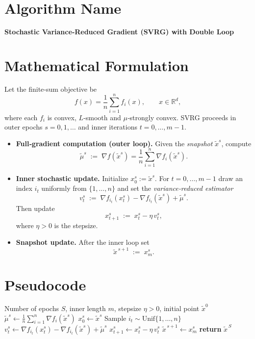 \documentclass{article}
\newcommand{\R}{\mathbb{R}}
\begin{document}
\section*{Algorithm Name}
\textbf{Stochastic Variance‑Reduced Gradient (SVRG) with Double Loop}

\section*{Mathematical Formulation}
Let the finite‑sum objective be 
\[
f(x)=\frac{1}{n}\sum_{i=1}^{n}f_i(x),\qquad x\in\R^{d},
\]
where each $f_i$ is convex, $L$‑smooth and $\mu$‑strongly convex.  
SVRG proceeds in outer epochs $s=0,1,\dots$ and inner iterations $t=0,\dots,m-1$.

\begin{itemize}
\item \textbf{Full‑gradient computation (outer loop).}  
Given the \emph{snapshot} $\tilde{x}^{s}$, compute
\[
\tilde{\mu}^{s}\;:=\;\nabla f(\tilde{x}^{s})=\frac{1}{n}\sum_{i=1}^{n}\nabla f_i(\tilde{x}^{s}).
\]

\item \textbf{Inner stochastic update.}  
Initialize $x_{0}^{s}:=\tilde{x}^{s}$. For $t=0,\dots,m-1$ draw an index $i_t$ uniformly from $\{1,\dots,n\}$ and set the \emph{variance‑reduced estimator}
\[
v_{t}^{s}\;:=\;\nabla f_{i_t}(x_{t}^{s})-\nabla f_{i_t}(\tilde{x}^{s})+\tilde{\mu}^{s}.
\]
Then update
\[
x_{t+1}^{s}\;:=\;x_{t}^{s}-\eta\,v_{t}^{s},
\]
where $\eta>0$ is the stepsize.

\item \textbf{Snapshot update.}  
After the inner loop set
\[
\tilde{x}^{\,s+1}\;:=\;x_{m}^{s}.
\]
\end{itemize}

\section*{Pseudocode}
\begin{algorithm}[H]
\caption{SVRG}
\begin{algorithmic}[1]
\Require Number of epochs $S$, inner length $m$, stepsize $\eta>0$, initial point $\tilde{x}^{0}$
    \State $\displaystyle \tilde{\mu}^{s}\gets\frac{1}{n}\sum_{i=1}^{n}\nabla f_i(\tilde{x}^{s})$ 
    \State $x_{0}^{s}\gets \tilde{x}^{s}$
        \State Sample $i_t\sim\text{Unif}\{1,\dots,n\}$
        \State $v_{t}^{s}\gets \nabla f_{i_t}(x_{t}^{s})-\nabla f_{i_t}(\tilde{x}^{s})+\tilde{\mu}^{s}$
        \State $x_{t+1}^{s}\gets x_{t}^{s}-\eta\,v_{t}^{s}$
    \EndFor
    \State $\tilde{x}^{\,s+1}\gets x_{m}^{s}$
\EndFor
\State \textbf{return} $\tilde{x}^{\,S}$
\end{algorithmic}
\end{algorithm}
\end{document}
